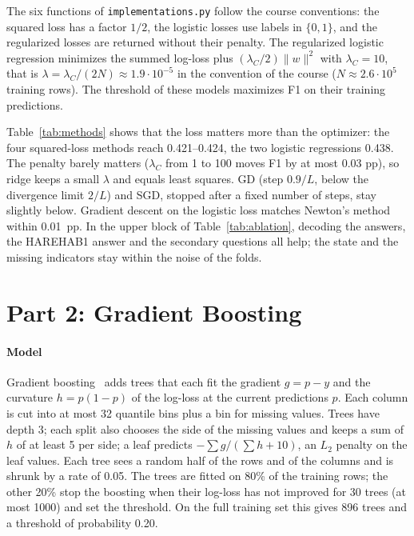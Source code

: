 \documentclass[10pt,conference,compsocconf]{IEEEtran}
\begin{document}
The six functions of \texttt{implementations.py} follow the course conventions:
the squared loss has a factor $1/2$, the logistic losses use labels in $\{0,1\}$,
and the regularized losses are returned without their penalty. The regularized
logistic regression minimizes the summed log-loss plus $(\lambda_C/2)\|w\|^2$
with $\lambda_C=10$, that is $\lambda = \lambda_C/(2N) \approx 1.9\cdot10^{-5}$
in the convention of the course ($N\approx2.6\cdot10^5$ training rows). The
threshold of these models maximizes F1 on their training predictions.

Table~\ref{tab:methods} shows that the loss matters more than the optimizer: the
four squared-loss methods reach 0.421--0.424, the two logistic regressions 0.438.
The penalty barely matters ($\lambda_C$ from 1 to 100 moves F1 by at most
0.03 pp), so ridge keeps a small $\lambda$ and equals least squares.
GD (step $0.9/L$, below the divergence limit $2/L$) and SGD, stopped after a
fixed number of steps, stay slightly below. Gradient descent on the logistic
loss matches Newton's method within 0.01~pp. In the upper block of
Table~\ref{tab:ablation}, decoding the answers, the HAREHAB1 answer and the
secondary questions all help; the state and the missing indicators stay within
the noise of the folds.

\section{Part 2: Gradient Boosting}\label{sec:part2}

\paragraph{Model}
Gradient boosting~\cite{friedman01} adds trees that each fit the gradient
$g=p-y$ and the curvature $h=p(1-p)$ of the log-loss at the current predictions
$p$. Each column is cut into at most 32 quantile bins plus a bin for missing
values. Trees have depth 3;
each split also chooses the side of the missing values and keeps a sum of $h$ of
at least 5 per side; a leaf predicts $-\sum g/(\sum h + 10)$, an $L_2$
penalty on the leaf values. Each tree sees a random half of the rows and of
the columns and is shrunk by a rate of 0.05. The trees are fitted on 80\% of the
training rows; the other 20\% stop the boosting when their log-loss has not
improved for 30 trees (at most 1000) and set the threshold. On the full training
set this gives 896 trees and a threshold of probability 0.20.
\end{document}
